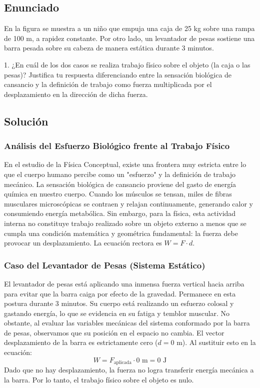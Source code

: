 \documentclass[a4paper,12pt]{article}
\begin{document}
\newpage

\subsection*{Enunciado}
En la figura se muestra a un niño que empuja una caja de 25 kg sobre una rampa de 100 m, a rapidez constante. Por otro lado, un levantador de pesas sostiene una barra pesada sobre su cabeza de manera estática durante 3 minutos. 

1. ¿En cuál de los dos casos se realiza trabajo físico sobre el objeto (la caja o las pesas)? Justifica tu respuesta diferenciando entre la sensación biológica de cansancio y la definición de trabajo como fuerza multiplicada por el desplazamiento en la dirección de dicha fuerza.

\subsection*{Solución}

\subsubsection*{Análisis del Esfuerzo Biológico frente al Trabajo Físico}
En el estudio de la Física Conceptual, existe una frontera muy estricta entre lo que el cuerpo humano percibe como un "esfuerzo" y la definición de trabajo mecánico. La sensación biológica de cansancio proviene del gasto de energía química en nuestro cuerpo. Cuando los músculos se tensan, miles de fibras musculares microscópicas se contraen y relajan continuamente, generando calor y consumiendo energía metabólica. Sin embargo, para la física, esta actividad interna no constituye trabajo realizado sobre un objeto externo a menos que se cumpla una condición matemática y geométrica fundamental: la fuerza debe provocar un desplazamiento. La ecuación rectora es $W = F \cdot d$.

\subsubsection*{Caso del Levantador de Pesas (Sistema Estático)}
El levantador de pesas está aplicando una inmensa fuerza vertical hacia arriba para evitar que la barra caiga por efecto de la gravedad. Permanece en esta postura durante 3 minutos. Su cuerpo está realizando un esfuerzo colosal y gastando energía, lo que se evidencia en su fatiga y temblor muscular. 
No obstante, al evaluar las variables mecánicas del sistema conformado por la barra de pesas, observamos que su posición en el espacio no cambia. El vector desplazamiento de la barra es estrictamente cero ($d = 0\text{ m}$). Al sustituir esto en la ecuación:
$$W = F_{\text{aplicada}} \cdot 0\text{ m} = 0\text{ J}$$
Dado que no hay desplazamiento, la fuerza no logra transferir energía mecánica a la barra. Por lo tanto, el trabajo físico sobre el objeto es nulo.
\end{document}
